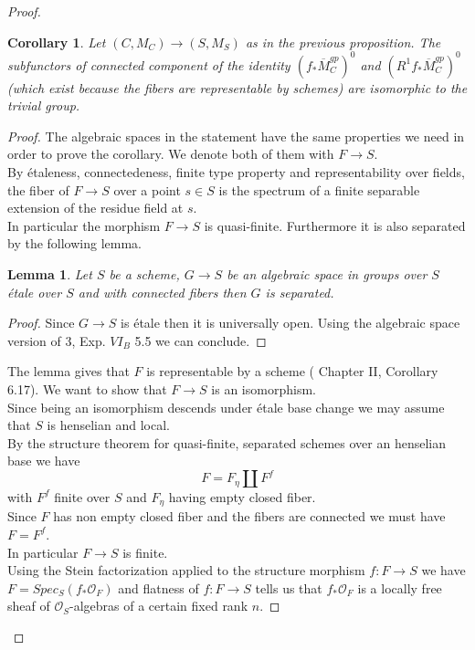 \documentclass{amsart}
\newtheorem{lm}[thm]{Lemma}
\newtheorem{cor}[thm]{Corollary}
\theoremstyle{definition}
\numberwithin{equation}{section}
\begin{document}
\begin{proof}
\begin{cor}\label{r1zero}
Let $(C,M_C){\rightarrow} (S,M_S)$ as in the previous proposition. The subfunctors of connected component of the identity $(f_{*}\overline{M}_C^{gp})^0 $ and $(R^1f_{*}\overline{M}_C^{gp})^0$ (which exist because the fibers are representable by schemes) are isomorphic to the trivial group.
\end{cor}
\begin{proof}
The algebraic spaces in the statement have the same properties we need in order to prove the corollary. We denote both of them with $F{\rightarrow} S$.\\
By \'etaleness, connectedeness, finite type property and representability over fields, the fiber of $F{\rightarrow} S$ over a point $s\in S$ is the spectrum of a finite separable extension of the residue field at $s$.\\ 
In particular the morphism $F{\rightarrow} S$ is quasi-finite. 
Furthermore it is also separated by the following lemma.
\begin{lm}
Let $S$ be a scheme, $G{\rightarrow} S$ be an algebraic space in groups over $S$ \'etale over $S$ and with connected fibers then $G$ is separated.
\end{lm}
\begin{proof}
Since $G{\rightarrow} S$ is \'etale then it is universally open. Using the algebraic space version of \cite{sga} 3, Exp. $VI_B$ 5.5 we can conclude. 
\end{proof}
The lemma gives that $F$ is representable by a scheme (\cite{kn} Chapter II, Corollary 6.17).
We want to show that $F{\rightarrow} S$ is an isomorphism.\\
Since being an isomorphism descends under \'etale base change we may assume that $S$ is henselian and local.\\ By the structure theorem for quasi-finite, separated schemes over an henselian base we have
$$
F=F_{\eta}\coprod F^f
$$
\noindent with $F^f$ finite over $S$ and $F_{\eta}$ having empty closed fiber. \\
Since $F$ has non empty closed fiber and the fibers are connected we must have $F=F^f$.\\
In particular $F{\rightarrow} S$ is finite.\\ Using the Stein factorization
applied to the structure morphism $f:F{\rightarrow} S$ we have $F=Spec_{S}(f_{*}{\mathcal{O}}_F)$ and flatness of $f:F{\rightarrow} S$ tells us that $f_{*}{\mathcal{O}}_F$ is a locally free sheaf of ${\mathcal{O}}_S$-algebras of a certain fixed rank $n$. 

\end{proof}
\end{proof}
\end{document}
